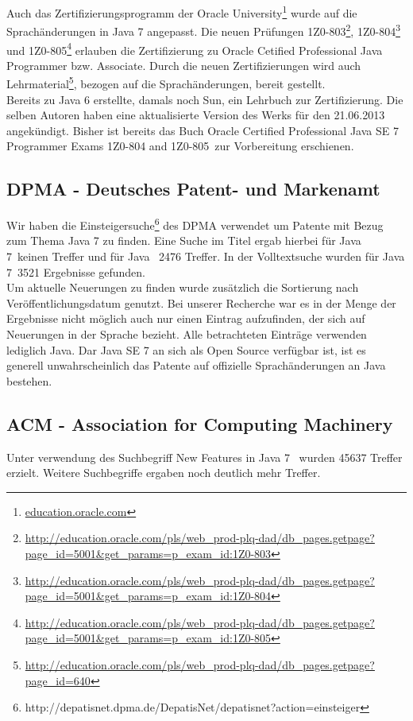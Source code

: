 Auch das Zertifizierungsprogramm der Oracle University\footnote{\url{education.oracle.com}} wurde auf die Sprachänderungen in Java 7 angepasst.
Die neuen Prüfungen 1Z0-803\footnote{\url{http://education.oracle.com/pls/web_prod-plq-dad/db_pages.getpage?page_id=5001&get_params=p_exam_id:1Z0-803}}, 
1Z0-804\footnote{\url{http://education.oracle.com/pls/web_prod-plq-dad/db_pages.getpage?page_id=5001&get_params=p_exam_id:1Z0-804}} und 
1Z0-805\footnote{\url{http://education.oracle.com/pls/web_prod-plq-dad/db_pages.getpage?page_id=5001&get_params=p_exam_id:1Z0-805}} 
erlauben die Zertifizierung zu Oracle Cetified Professional Java Programmer bzw. Associate.
Durch die neuen Zertifizierungen wird auch Lehrmaterial\footnote{\url{http://education.oracle.com/pls/web_prod-plq-dad/db_pages.getpage?page_id=640}}, 
bezogen auf die Sprachänderungen, bereit gestellt.\\

Bereits zu Java 6 erstellte, damals noch Sun, ein Lehrbuch\cite{scjp6} zur Zertifizierung. Die selben Autoren haben eine aktualisierte 
Version des Werks\cite{scjp7} für den 21.06.2013 angekündigt. Bisher ist bereits das Buch 
\glqq Oracle Certified Professional Java SE 7 Programmer Exams 1Z0-804 and 1Z0-805\grqq\cite{apressjava}~zur Vorbereitung erschienen.

\subsection{DPMA - Deutsches Patent- und Markenamt}

Wir haben die Einsteigersuche\footnote{http://depatisnet.dpma.de/DepatisNet/depatisnet?action=einsteiger} des DPMA verwendet um Patente mit Bezug zum Thema Java 7 zu finden. Eine Suche im Titel ergab hierbei für \glqq Java 7\grqq ~keinen Treffer und für \glqq Java \grqq ~2476 Treffer. In der Volltextsuche wurden für \glqq Java 7\grqq ~3521 Ergebnisse gefunden.\\

Um aktuelle Neuerungen zu finden wurde zusätzlich die Sortierung nach Veröffentlichungsdatum genutzt. Bei unserer Recherche war es in der Menge der Ergebnisse nicht möglich auch nur einen Eintrag aufzufinden, der sich auf Neuerungen in der Sprache bezieht. Alle betrachteten Einträge verwenden lediglich Java. Dar Java SE 7 an sich als Open Source verfügbar ist, ist es generell unwahrscheinlich das Patente auf offizielle Sprachänderungen an Java bestehen.\\

\subsection{ACM - Association for Computing Machinery}
Unter verwendung des Suchbegriff \glqq New Features in Java 7 \grqq ~wurden 45637 Treffer erzielt.
Weitere Suchbegriffe ergaben noch deutlich mehr Treffer.\\

